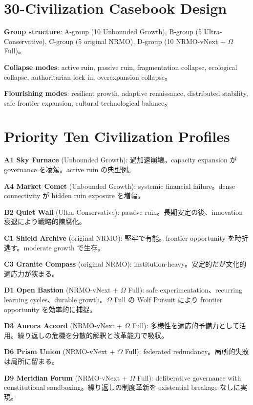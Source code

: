 \documentclass[11pt,a4paper]{article}
\theoremstyle{definition}\newtheorem{definition}{Definition}[section]
\begin{document}
\section{30-Civilization Casebook Design}

\textbf{Group structure}: A-group (10 Unbounded Growth), B-group (5 Ultra-Conservative), C-group (5 original NRMO), D-group (10 NRMO-vNext + $\Omega$ Full)。

\textbf{Collapse modes}: active ruin, passive ruin, fragmentation collapse, ecological collapse, authoritarian lock-in, overexpansion collapse。

\textbf{Flourishing modes}: resilient growth, adaptive renaissance, distributed stability, safe frontier expansion, cultural-technological balance。


\section{Priority Ten Civilization Profiles}

\textbf{A1 Sky Furnace} (Unbounded Growth): 過加速崩壊。capacity expansion が governance を凌駕。active ruin の典型例。

\textbf{A4 Market Comet} (Unbounded Growth): systemic financial failure。dense connectivity が hidden ruin exposure を増幅。

\textbf{B2 Quiet Wall} (Ultra-Conservative): passive ruin。長期安定の後、innovation 衰退により戦略的陳腐化。

\textbf{C1 Shield Archive} (original NRMO): 堅牢で有能。frontier opportunity を時折逃す。moderate growth で生存。

\textbf{C3 Granite Compass} (original NRMO): institution-heavy。安定的だが文化的適応力が狭まる。

\textbf{D1 Open Bastion} (NRMO-vNext + $\Omega$ Full): safe experimentation、recurring learning cycles、durable growth。$\Omega$ Full の Wolf Pursuit により frontier opportunity を効率的に捕捉。

\textbf{D3 Aurora Accord} (NRMO-vNext + $\Omega$ Full): 多様性を適応的予備力として活用。繰り返しの危機を分散的解釈と改革能力で吸収。

\textbf{D6 Prism Union} (NRMO-vNext + $\Omega$ Full): federated redundancy。局所的失敗は局所に留まる。

\textbf{D9 Meridian Forum} (NRMO-vNext + $\Omega$ Full): deliberative governance with constitutional sandboxing。繰り返しの制度革新を existential breakage なしに実現。
\end{document}
